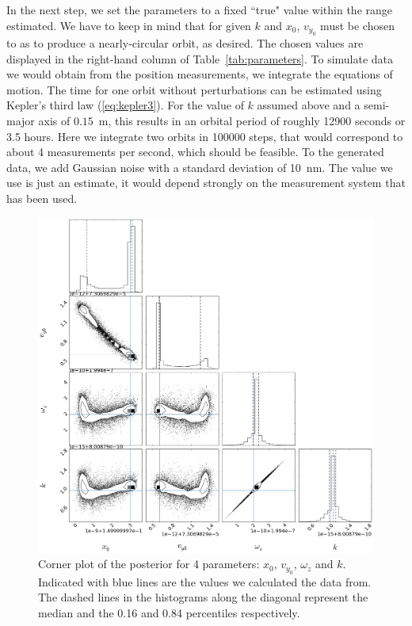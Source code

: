 \documentclass[onecolumn]{aa} %
\begin{document}
In the next step, we set the parameters to a fixed ``true" value
within the range estimated. We have to keep in mind that for given $k$
and $x_0$, $v_{y_0}$ must be chosen to as to produce a nearly-circular
orbit, as desired.  The chosen values are displayed in the right-hand
column of Table~\ref{tab:parameters}.  To simulate data we would
obtain from the position measurements, we integrate the equations of
motion. The time for one orbit without perturbations can be estimated
using Kepler's third law (\ref{eq:kepler3}). For the value of $k$
assumed above and a semi-major axis of $0.15$~m, this results in an
orbital period of roughly 12900 seconds or 3.5 hours. Here we
integrate two orbits in 100000 steps, that would correspond to about 4
measurements per second, which should be feasible. To the generated
data, we add Gaussian noise with a standard deviation of 10~nm. The
value we use is just an estimate, it would depend strongly on the
measurement system that has been used.

\begin{figure}%
	\centering
	\includegraphics[width=1.0\textwidth]{img/4cornerfit.png}
	\caption{Corner plot of the posterior for 4 parameters: $x_0$, $v_{y_0}$, $\omega_z$ and $k$. Indicated with blue lines are the values we calculated the data from. The dashed lines in the histograms along the diagonal represent the median and the 0.16 and 0.84 percentiles respectively.}
	\label{fig:plotCorner4}
\end{figure}
\end{document}

